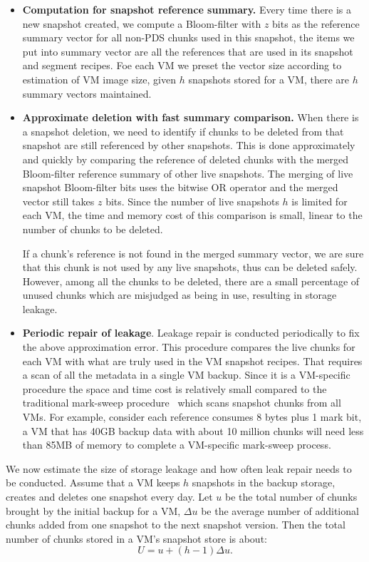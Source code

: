 \begin{itemize}
\item {\bf Computation for snapshot reference summary.}
Every time there is a new snapshot created,
we compute a Bloom-filter with $z$ bits as the reference summary vector for all non-PDS chunks used 
in this snapshot,
the items we put into summary vector are all the references that are used in its snapshot and segment recipes.
Foe each VM we preset the vector size according to  estimation of VM image size,
given $h$ snapshots stored for a VM, there are $h$ summary vectors maintained.

\item {\bf Approximate deletion with fast summary comparison.}
When there is a snapshot deletion,  
we need to identify if  chunks to be deleted from that snapshot
are still referenced by other snapshots. 
This is done approximately and quickly by comparing the 
reference of deleted chunks  with
the merged Bloom-filter reference summary of other live snapshots.
The merging of live snapshot Bloom-filter bits uses the bitwise OR operator 
and the merged vector still takes $z$ bits.
Since the number of live snapshots $h$ is limited for
each VM, 
the time and memory cost of this comparison is small, linear to the number of chunks to be deleted.

If a chunk's reference is not found in the merged summary vector, we are sure that
this chunk is not used by any live snapshots, thus can be deleted safely.
However, among all the chunks to be deleted, 
there are a small percentage of unused chunks  which
are misjudged as  being in use, resulting in storage leakage.

\item {\bf Periodic repair of leakage}.
Leakage repair is conducted periodically to fix the above approximation error.
This procedure compares the live chunks for each VM with what are truly used in the VM snapshot recipes.
That requires a scan of all the metadata in a single VM backup. Since it is a VM-specific procedure 
the space and time cost is relatively small compared to the traditional mark-sweep procedure~\cite{Guo2011} which scans snapshot 
chunks from all VMs.
For example,
consider each reference consumes 8 bytes plus  1 mark bit, a VM that has 40GB backup data with about
10 million chunks will need less than 85MB of memory to complete a VM-specific mark-sweep process.
\end{itemize}

We now estimate the size of storage leakage and how often leak repair needs to be conducted.
Assume that  a VM keeps $h$ snapshots in the backup storage, creates and deletes one snapshot
every day. Let $u$ be the total number of chunks brought by the initial backup for a VM, $\Delta u$ be the average
number of additional chunks added from one snapshot to the next snapshot version. Then the total number of 
chunks stored in a VM's snapshot store is about:
\[
U = u + (h-1)\Delta u.
\]

